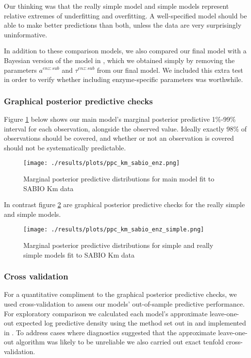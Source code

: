 \documentclass[11pt]{article}
\begin{document}
Our thinking was that the really simple model and simple models represent
relative extremes of underfitting and overfitting. A well-specified model should
be able to make better predictions than both, unless the data are very
surprisingly uninformative.

In addition to these comparison models, we also compared our final model with a
Bayesian version of the model in ,
which we obtained simply by removing the parameters \(a^{enz:sub}\) and
\(\tau^{enz:sub}\) from our final model. We included this extra test in order to
verify whether including enzyme-specific parameters was worthwhile.

\subsubsection{Graphical posterior predictive checks}
\label{sec:org802ecca}
Figure \ref{fig:org169524e} below shows our main model's marginal posterior
predictive 1\%-99\% interval for each observation, alongside the observed
value. Ideally exactly 98\% of observations should be covered, and whether or not
an observation is covered should not be systematically predictable.

\begin{figure}[htbp]
\centering
\texttt{[image: ./results/plots/ppc\_km\_sabio\_enz.png]}
\caption{\label{fig:org169524e}Marginal posterior predictive distributions for main model fit to SABIO Km data}
\end{figure}

In contrast figure \ref{fig:orgfb00340} are graphical posterior predictive checks for the really simple
and simple models.

\begin{figure}[htbp]
\centering
\texttt{[image: ./results/plots/ppc\_km\_sabio\_enz\_simple.png]}
\caption{\label{fig:orgfb00340}Marginal posterior predictive distributions for simple and really simple models fit to SABIO Km data}
\end{figure}

\subsubsection{Cross validation}
\label{sec:orgef84cd3}
For a quantitative compliment to the graphical posterior predictive checks, we
used cross-validation to assess our models' out-of-sample predictive
performance. For exploratory comparison we calculated each model's approximate
leave-one-out expected log predictive density using the method set out in  and implemented in . To address cases where diagnostics
suggested that the approximate leave-one-out algorithm was likely to be
unreliable we also carried out exact tenfold cross-validation.
\end{document}
